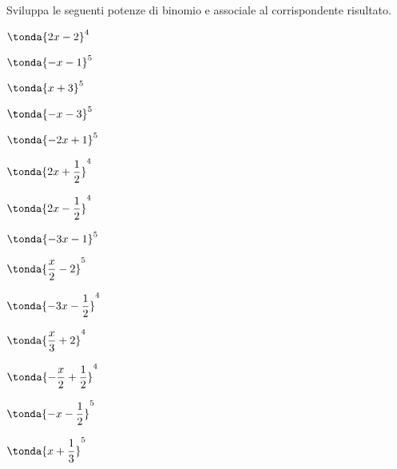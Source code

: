 \begin{esercizio}
\label{ese:11.29}
Sviluppa le seguenti potenze di binomio e associale al corrispondente 
risultato.

\begin{htmulticols}{4}
\begin{enumeratea}
\spazielenx
\item \(\tonda{2 x - 2}^{4}\) %
\item \(\tonda{- x - 1}^{5}\) %
\item \(\tonda{x + 3}^{5}\) %
\item \(\tonda{- x - 3}^{5}\) %
\item \(\tonda{- 2 x + 1}^{5}\) %
\item \(\tonda{2 x + \dfrac{1}{2}}^{4}\) %
\item \(\tonda{2 x - \dfrac{1}{2}}^{4}\) %
\item \(\tonda{- 3 x - 1}^{5}\) %
\item \(\tonda{\dfrac{x}{2} - 2}^{5}\) %
\item \(\tonda{- 3 x - \dfrac{1}{2}}^{4}\) %
\item \(\tonda{\dfrac{x}{3} + 2}^{4}\) %
\item \(\tonda{- \dfrac{x}{2} + \dfrac{1}{2}}^{4}\) %
\item \(\tonda{- x - \dfrac{1}{2}}^{5}\) %
\item \(\tonda{x + \dfrac{1}{3}}^{5}\) %

\end{enumeratea}
\end{htmulticols}
\end{esercizio}
